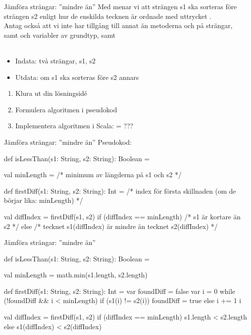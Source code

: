 \begin{Slide}{Jämföra strängar: ''mindre än''}\SlideFontSmall
Med  menar vi att strängen s1 ska sorteras före strängen s2 enligt hur de enskilda tecknen är ordnade med uttrycket . \\
Antag också att vi inte har tillgång till annat än metoderna  och  på strängar, samt   och variabler av grundtyp, samt 
\\\\
\begin{itemize}
\item Indata: två strängar, s1, s2
\item Utdata:  om s1 ska sorteras före s2 annars 
\end{itemize}
\begin{enumerate}
\item Klura ut din lösningsidé
\item Formulera algoritmen i pseudokod
\item Implementera algoritmen i Scala:  = ???
\end{enumerate}
\end{Slide}

\begin{Slide}{Jämföra strängar: ''mindre än''}\SlideFontSmall
Pseudokod:
\begin{Code}
def isLessThan(s1: String, s2: String): Boolean = {
  
  val minLength = /* minimum av längderna på s1 och s2 */
  
  def firstDiff(s1: String, s2: String): Int = 
    /* index för första skillnaden (om de börjar lika: minLength) */

  val diffIndex = firstDiff(s1, s2)
  if (diffIndex == minLength) /* s1 är kortare än s2 */
  else /* tecknet s1(diffIndex) är mindre än tecknet s2(diffIndex) */ 
}
\end{Code}
\end{Slide}

\begin{Slide}{Jämföra strängar: ''mindre än''}\SlideFontSmall
\begin{Code}
def isLessThan(s1: String, s2: String): Boolean = {

  val minLength = math.min(s1.length, s2.length)

  def firstDiff(s1: String, s2: String): Int = {
    var foundDiff = false
    var i = 0
    while (!foundDiff && i < minLength) 
      if (s1(i) != s2(i)) foundDiff = true 
      else i += 1
    i
  }

  val diffIndex = firstDiff(s1, s2)
  if (diffIndex == minLength) s1.length < s2.length
  else s1(diffIndex) < s2(diffIndex)
}
\end{Code}
\end{Slide}

